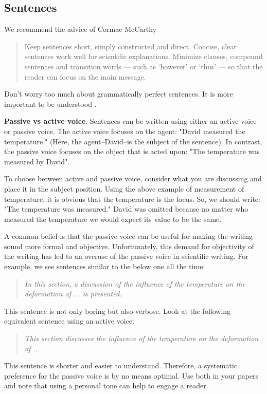 \documentclass[authoryear,12pta4paper,fleqn]{article}
\numberwithin{equation}{section}
\theoremstyle{remark}
\begin{document}
\subsection{Sentences}\label{sec:sentences}

We recommend the advice of Cormac McCarthy \citep{savage2019novelist}

\begin{quote}
Keep sentences short, simply constructed and direct. Concise, clear sentences work well for scientific explanations. Minimize clauses, compound sentences and transition words — such as ‘however’ or ‘thus’ — so that the reader can focus on the main message.
\end{quote}
Don't worry too much about grammatically perfect sentences. It is more important to be understood \citep{savage2019novelist}. 


\noindent\textbf{Passive vs active voice}.     Sentences can be written using either an active voice  or passive voice. The active voice focuses on the agent: "David measured the temperature." (Here, the agent--David--is the subject of the sentence). In contrast, the passive voice focuses on the object that is acted upon: "The temperature was measured by David". 

To choose between active and passive voice, consider what you are discussing and place it in the subject position. Using the above example of measurement of temperature, it is obvious that the temperature is the focus. So, we should write: "The temperature was measured." David was omitted because no matter who measured the temperature we would expect its value to be the same. 

 A common belief is that the passive voice can be useful for making the writing sound more formal and objective. 
Unfortunately, this demand for objectivity of the writing has led to an overuse of the passive voice in scientific writing. For example, we see  sentences similar to the below one all the time:

\begin{quote}
\textit{In this section, a discussion of the influence of the temperature on the deformation of ... is presented.}
\end{quote}
This sentence is not only boring but also verbose. Look at the following equivalent sentence using an active voice:

\begin{quote}
\textit{This section discusses the influence of the temperature on the deformation of ...}
\end{quote}
This sentence is shorter and easier to understand. Therefore, a systematic preference for the passive voice is by no means optimal. Use both in your papers and note that using a personal tone can help to engage a reader. 
\end{document}

